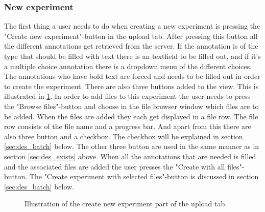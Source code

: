 \subsubsection{New experiment}
\label{sec:des_create}
The first thing a user needs to do when creating a new experiment is pressing the "Create new experiment"-button in the upload tab. After pressing this button all the different annotations get retrieved from the server. If the annotation is of the type that should be filled with text there is an textfield to be filled out, and if it's a multiple choice annotation there is a dropdown menu of the different choices. The annotations who have bold text are forced and needs to be filled out in order to create the experiment. There are also three buttons added to the view. This is illustrated in \ref{fig:des_upload-new}. In order to add files to this experiment the user needs to press the "Browse files"-button and choose in the file browser window which files are to be added. When the files are added they each get displayed in a file row. The file row consists of the file name and a progress bar. And apart from this there are also three button and a checkbox. The checkbox will be explained in section \ref{sec:des_batch} below. The other three button are used in the same manner as in section \ref{sec:des_exists} above. When all the annotations that are needed is filled and the associated files are added the user presses the "Create with all files"-button. The "Create experiment with selected files"-button is discussed in section \ref{sec:des_batch} below.
\\
\begin{figure}[h]
	\caption{Illustration of the create new experiment part of the upload tab.}
	\label{fig:des_upload-new}
\end{figure}
